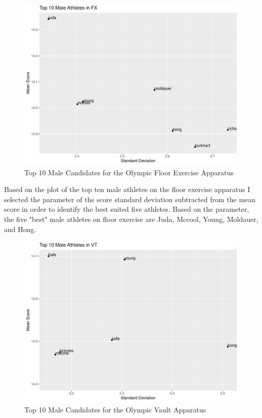 \documentclass[12pt]{article}
\begin{document}
\begin{figure}
    \centering
    \includegraphics[scale=0.6]{MaleAthletesFX.pdf}
    \caption{Top 10 Male Candidates for the Olympic Floor Exercise Apparatus}
    \label{fig:FXM}
  \end{figure}

  Based on the plot of the top ten male athletes on the floor exercise apparatus I selected the parameter of 
  the score standard deviation subtracted from the mean score in order to identify the best suited five 
  athletes. Based on the parameter, the five "best" male athletes on floor exercise are Juda, Mccool, Young, Moldauer, 
  and Hong.

\begin{figure}
    \centering
    \includegraphics[scale=0.6]{MaleAthletesVT.pdf}
    \caption{Top 10 Male Candidates for the Olympic Vault Apparatus}
    \label{fig:VTM}
  \end{figure}
\end{document}
